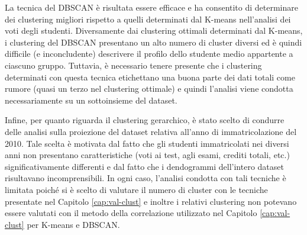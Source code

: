 \documentclass[12pt]{article}
\begin{document}
La tecnica del DBSCAN è risultata essere efficace e ha consentito di determinare dei clustering migliori rispetto a quelli determinati dal K-means nell'analisi dei voti degli studenti. 
Diversamente dai clustering ottimali determinati dal K-means, i clustering del DBSCAN presentano un alto numero di cluster diversi ed è quindi difficile (e inconcludente) descrivere il profilo dello studente medio appartente a ciascuno gruppo. 
Tuttavia, è necessario tenere presente che i clustering determinati con questa tecnica etichettano una buona parte dei dati totali come rumore (quasi un terzo nel clustering ottimale) e quindi l'analisi viene condotta necessaria\-mente su un sottoinsieme del dataset. 

Infine, per quanto riguarda il clustering gerarchico, è stato scelto di condurre delle analisi sulla proiezione del dataset relativa all'anno di im\-matricolazione del 2010. 
Tale scelta è motivata dal fatto che gli studenti imma\-tricolati nei diversi anni non presentano caratteristiche (voti ai test, agli esami, crediti totali, etc.) significativamente differenti e dal fatto che i dendogrammi dell'intero dataset risultavano incomprensibili. 
In ogni caso, l'analisi condotta con tali tecniche è limitata poiché si è scelto di valutare il numero di cluster con le tecniche presentate nel Capitolo \ref{cap:val-clust} e inoltre i relativi clustering non potevano essere valutati con il metodo della correlazione utilizzato nel Capitolo \ref{cap:val-clust} per K-means e DBSCAN.
\newpage 

\listoffigures
 
\newpage


\listoftables

\newpage

\end{document}
